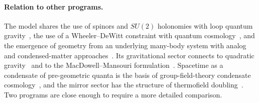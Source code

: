 \documentclass[reprint,aps,prd,amsmath,amssymb,superscriptaddress,nofootinbib,floatfix]{revtex4-2}
\theoremstyle{plain}
\theoremstyle{definition}
\theoremstyle{remark}
\newcommand{\SU}{SU(2)}
\begin{document}
\paragraph*{Relation to other programs.} The model shares the use of spinors and $\SU$ holonomies with loop
quantum gravity~\cite{Rovelli2004,Thiemann2007}, the use of a Wheeler--DeWitt constraint with
quantum cosmology~\cite{HartleHawking1983,Hawking1984}, and the emergence of geometry from an underlying
many-body system with analog and condensed-matter approaches~\cite{Volovik2009,Barcelo2011,KMS2008}. Its
gravitational sector connects to quadratic gravity~\cite{Stelle1977,Starobinsky1980,AlvarezGaume2016} and to the
MacDowell--Mansouri formulation~\cite{MacDowellMansouri1977,Wise2010}. Spacetime as a condensate of
pre-geometric quanta is the basis of group-field-theory condensate cosmology~\cite{GielenOritiSindoni2013,Oriti2021}, and the
mirror sector has the structure of thermofield doubling~\cite{TakahashiUmezawa1975,Israel1976}. Two programs are close
enough to require a more detailed comparison.
\end{document}
